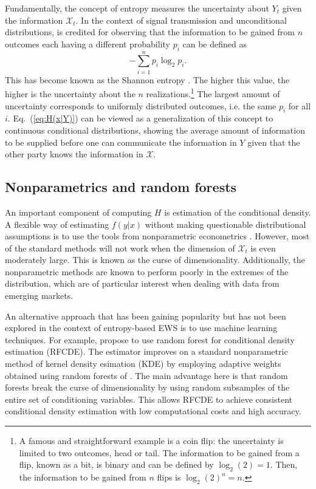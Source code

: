 Fundamentally, the concept of entropy measures the uncertainty about $Y_t$ given the information $\mathcal{X}_t$. In the context of signal transmission and unconditional distributions, \cite{hartley:28} is credited for observing that the information to be gained from $n$ outcomes each having a different probability $p_i$ can be defined as 
\[-\sum_{i=1}^n p_i \log_2 p_i.\]This has become known as the Shannon entropy \citep{shannon:48}. The higher this value, the higher is the uncertainty about the $n$ realizations.\footnote{A famous and straightforward example is a coin flip: the uncertainty is limited to two outcomes, head or tail. The information to be gained from a flip, known as a bit, is binary and can be defined by $\log_2 (2)=1$. Then, the information to be gained from $n$ flips is $\log_2(2)^n=n$.}  The largest amount of uncertainty corresponds to uniformly distributed outcomes, i.e. the same $p_i$ for all $i$. Eq.~(\ref{eq:H(x|Y)}) can be viewed as a generalization of this concept to continuous conditional distributions, showing the average amount of information to be supplied before one can communicate the information in $Y$ given that the other party knows the information in $\mathcal{X}$.


\subsection{Nonparametrics and random forests}

An important component of computing $H$ is estimation of the conditional density. A flexible way of estimating $f(y|x)$ without making questionable distributional assumptions is to use the tools from nonparametric econometrics \cite[see, e.g.,][]{li/racine:23}. However, most of the standard methods will not work  when the dimension of $\mathcal{X}_{t}$ is even moderately large. This is known as the curse of dimensionality. Additionally, the nonparametric methods are known to perform poorly in the extremes of the distribution, which are of particular interest when dealing with data from emerging markets.

An alternative approach that has been gaining popularity but has not been explored in the context of entropy-based EWS is to use machine learning techniques. For example, \cite{Pospisil} propose to use random forest for conditional density estimation (RFCDE). The estimator improves on a standard nonparametric method of kernel density esimation (KDE) by employing adaptive weights obtained using random forests of \cite{Breiman}. The main advantage here is that random forests break the curse of dimensionality by using random subsamples of the entire set of conditioning variables. This allows RFCDE to achieve consistent conditional density estimation with low computational costs and high accuracy.

